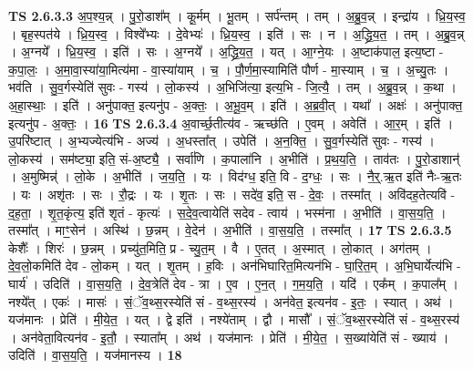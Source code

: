 \documentclass[17pt]{extarticle}
\begin{document}
                  \newline
                                \textbf{ TS 2.6.3.3} \newline
                  अ॒प॒श्य॒न्न् । पु॒रो॒डाश᳚म् । कू॒र्मम् । भू॒तम् । सर्प॑न्तम् । तम् । अ॒ब्रु॒व॒न्न् । इन्द्रा॑य । ध्रि॒य॒स्व॒ । बृह॒स्पत॑ये । ध्रि॒य॒स्व॒ । विश्वे᳚भ्यः । दे॒वेभ्यः॑ । ध्रि॒य॒स्व॒ । इति॑ । सः । न । अ॒द्ध्रि॒य॒त॒ । तम् । अ॒ब्रु॒व॒न्न् । अ॒ग्नये᳚ । ध्रि॒य॒स्व॒ । इति॑ । सः । अ॒ग्नये᳚ । अ॒द्ध्रि॒य॒त॒ । यत् । आ॒ग्ने॒यः । अ॒ष्टाक॑पाल॒ इत्य॒ष्टा - क॒पा॒लः॒ । अ॒मा॒वा॒स्या॑या॒मित्य॑मा - वा॒स्या॑याम् । च॒ । पौ॒र्ण॒मा॒स्यामिति॑ पौर्ण - मा॒स्याम् । च॒ । अ॒च्यु॒तः । भव॑ति । सु॒व॒र्गस्येति॑ सुवः - गस्य॑ । लो॒कस्य॑ । अ॒भिजि॑त्या॒ इत्य॒भि - जि॒त्यै॒ । तम् । अ॒ब्रु॒व॒न्न् । क॒था । अ॒हा॒स्थाः॒ । इति॑ । अनु॑पाक्त॒ इत्यनु॑प - अ॒क्तः॒ । अ॒भू॒व॒म् । इति॑ । अ॒ब्र॒वी॒त् । यथा᳚ । अक्षः॑ । अनु॑पाक्त॒ इत्यनु॑प - अ॒क्तः॒ । \textbf{  16} \newline
                  \newline
                                \textbf{ TS 2.6.3.4} \newline
                  अ॒वार्च्छ॒तीत्य॑व - ऋच्छ॑ति । ए॒वम् । अवेति॑ । आ॒र॒म् । इति॑ । उ॒परि॑ष्टात् । अ॒भ्यज्येत्य॑भि - अज्य॑ । अ॒धस्ता᳚त् । उपेति॑ । अ॒न॒क्ति॒ । सु॒व॒र्गस्येति॑ सुवः - गस्य॑ । लो॒कस्य॑ । सम॑ष्ट्या॒ इति॒ सं-अ॒ष्ट्यै॒ । सर्वा॑णि । क॒पाला॑नि । अ॒भीति॑ । प्र॒थ॒य॒ति॒ । ताव॑तः । पु॒रो॒डाशान्॑ । अ॒मुष्मिन्न्॑ । लो॒के । अ॒भीति॑ । ज॒य॒ति॒ । यः । विद॑ग्ध॒ इति॒ वि - द॒ग्धः॒ । सः । नै॒र्॒.ऋ॒त इति॑ नैः-ऋ॒तः । यः । अशृ॑तः । सः । रौ॒द्रः । यः । शृ॒तः । सः । सदे॑व॒ इति॒ स - दे॒वः॒ । तस्मा᳚त् । अवि॑दह॒तेत्यवि॑ - द॒ह॒ता॒ । शृ॒त॒कृंत्य॒ इति॑ शृतं - कृत्यः॑ । स॒दे॒व॒त्वायेति॑ सदेव - त्वाय॑ । भस्म॑ना । अ॒भीति॑ । वा॒स॒य॒ति॒ । तस्मा᳚त् । माꣳ॒॒सेन॑ । अस्थि॑ । छ॒न्नम् । वे॒देन॑ । अ॒भीति॑ । वा॒स॒य॒ति॒ । तस्मा᳚त् । \textbf{  17} \newline
                  \newline
                                \textbf{ TS 2.6.3.5} \newline
                  केशैः᳚ । शिरः॑ । छ॒न्नम् । प्रच्यु॑त॒मिति॒ प्र - च्यु॒त॒म् । वै । ए॒तत् । अ॒स्मात् । लो॒कात् । अग॑तम् । दे॒व॒लो॒कमिति॑ देव - लो॒कम् । यत् । शृ॒तम् । ह॒विः । अन॑भिघारित॒मित्यन॑भि - घा॒रि॒त॒म् । अ॒भि॒घार्येत्य॑भि - घार्य॑ । उदिति॑ । वा॒स॒य॒ति॒ । दे॒व॒त्रेति॑ देव - त्रा । ए॒व । ए॒न॒त् । ग॒म॒य॒ति॒ । यदि॑ । एक᳚म् । क॒पाल᳚म् । नश्ये᳚त् । एकः॑ । मासः॑ । सं॒ॅव॒थ्स॒रस्येति॑ सं - व॒थ्स॒रस्य॑ । अन॑वेत॒ इत्यन॑व - इ॒तः॒ । स्यात् । अथ॑ । यज॑मानः । प्रेति॑ । मी॒ये॒त॒ । यत् । द्वे इति॑ । नश्ये॑ताम् । द्वौ । मासौ᳚ । सं॒ॅव॒थ्स॒रस्येति॑ सं - व॒थ्स॒रस्य॑ । अन॑वेता॒वित्यन॑व - इ॒तौ॒ । स्याता᳚म् । अथ॑ । यज॑मानः । प्रेति॑ । मी॒ये॒त॒ । स॒ख्यांयेति॑ सं - ख्याय॑ । उदिति॑ । वा॒स॒य॒ति॒ । यज॑मानस्य । \textbf{  18} \newline
\end{document}
